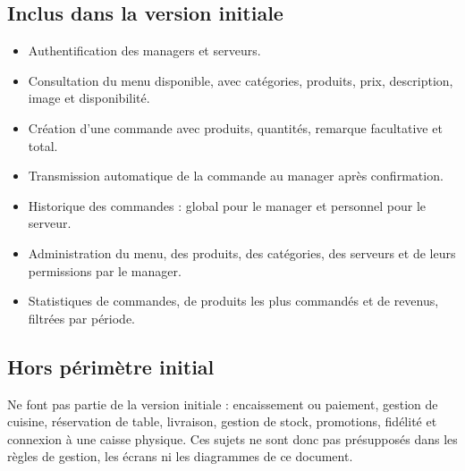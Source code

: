 \documentclass[11pt,a4paper]{article}
\begin{document}
\subsection{Inclus dans la version initiale}
\begin{itemize}
  \item Authentification des managers et serveurs.
  \item Consultation du menu disponible, avec catégories, produits, prix, description, image et disponibilité.
  \item Création d’une commande avec produits, quantités, remarque facultative et total.
  \item Transmission automatique de la commande au manager après confirmation.
  \item Historique des commandes : global pour le manager et personnel pour le serveur.
  \item Administration du menu, des produits, des catégories, des serveurs et de leurs permissions par le manager.
  \item Statistiques de commandes, de produits les plus commandés et de revenus, filtrées par période.
\end{itemize}

\subsection{Hors périmètre initial}
Ne font pas partie de la version initiale : encaissement ou paiement, gestion de cuisine, réservation de table, livraison, gestion de stock, promotions, fidélité et connexion à une caisse physique. Ces sujets ne sont donc pas présupposés dans les règles de gestion, les écrans ni les diagrammes de ce document.
\end{document}
